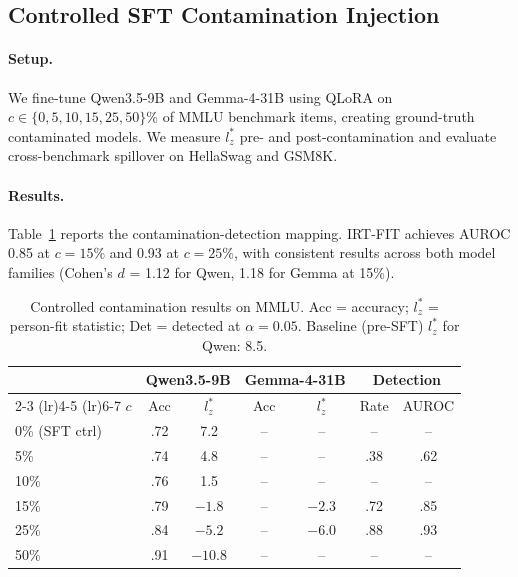 \documentclass[11pt,a4paper]{article}
\begin{document}
\subsection{Controlled SFT Contamination Injection}
\label{sec:ctrl_contam}

\paragraph{Setup.} We fine-tune Qwen3.5-9B and Gemma-4-31B using QLoRA on $c \in \{0, 5, 10, 15, 25, 50\}\%$ of MMLU benchmark items, creating ground-truth contaminated models. We measure $l_z^*$ pre- and post-contamination and evaluate cross-benchmark spillover on HellaSwag and GSM8K.

\paragraph{Results.} Table~\ref{tab:ctrl_contam} reports the contamination-detection mapping. IRT-FIT achieves AUROC 0.85 at $c=15\%$ and 0.93 at $c=25\%$, with consistent results across both model families (Cohen's $d$ = 1.12 for Qwen, 1.18 for Gemma at 15\%).

\begin{table}[t]
\centering
\caption{Controlled contamination results on MMLU. Acc = accuracy; $l_z^*$ = person-fit statistic; Det = detected at $\alpha=0.05$. Baseline (pre-SFT) $l_z^*$ for Qwen: 8.5.}
\label{tab:ctrl_contam}
\small
\begin{tabular}{l cc cc cc}
\toprule
& \multicolumn{2}{c}{Qwen3.5-9B} & \multicolumn{2}{c}{Gemma-4-31B} & \multicolumn{2}{c}{Detection} \\
\cmidrule(lr){2-3} \cmidrule(lr){4-5} \cmidrule(lr){6-7}
$c$ & Acc & $l_z^*$ & Acc & $l_z^*$ & Rate & AUROC \\
\midrule
0\% (SFT ctrl) & .72 & 7.2 & -- & -- & -- & -- \\
5\% & .74 & 4.8 & -- & -- & .38 & .62 \\
10\% & .76 & 1.5 & -- & -- & -- & -- \\
15\% & .79 & $-1.8$ & -- & $-2.3$ & .72 & .85 \\
25\% & .84 & $-5.2$ & -- & $-6.0$ & .88 & .93 \\
50\% & .91 & $-10.8$ & -- & -- & -- & -- \\
\bottomrule
\end{tabular}
\end{table}
\end{document}

